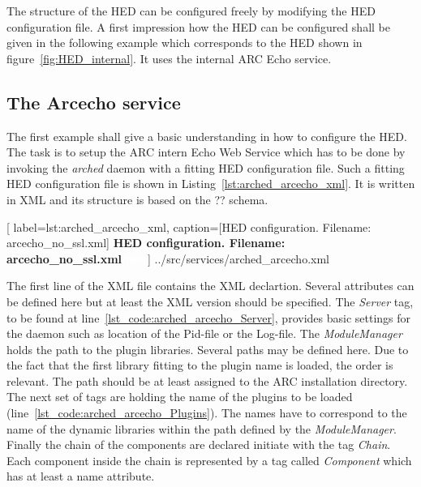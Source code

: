 The structure of the HED can be configured freely by modifying the HED configuration file. A first impression how the HED can be configured shall be given in the following example which corresponds to the HED shown in figure~\ref{fig:HED_internal}. It uses the internal ARC Echo service.



\subsection{The Arcecho service}
The first example shall give a basic understanding in how to configure the HED. The task is to setup the ARC intern Echo Web Service which has to be done by invoking the \textit{arched} daemon with a fitting HED configuration file. Such a fitting HED configuration file is shown in Listing~\ref{lst:arched_arcecho_xml}. It is written in XML and its structure is based on the \textcolor{urgent}{??} schema.
\\
\begin{program}
\centering

	[
	label=lst:arched_arcecho_xml,
	caption={[HED configuration. Filename: arcecho\_no\_ssl.xml]
	\textbf{HED configuration. Filename: arcecho\_no\_ssl.xml\textcolor{white}{hmf}}}
	]
{../src/services/arched_arcecho.xml}
\end{program}
The first line of the XML file contains the XML declartion. Several attributes can be defined here but at least the XML version should be specified.  %
The \textit{Server} tag, to be found at line~\ref{lst_code:arched_arcecho_Server}, provides basic settings for the daemon such as location of the Pid-file or the Log-file.
The \textit{ModuleManager} holds the path to the plugin libraries. Several paths may be defined here. Due to the fact that the first library fitting to the plugin name is loaded, the order is relevant. The path should be at least assigned to the ARC installation directory. %
The next set of tags are holding the name of the plugins to be loaded (line~\ref{lst_code:arched_arcecho_Plugins}).
The names have to correspond to the name of the dynamic libraries within the path defined by the \textit{ModuleManager}.
Finally the chain of the components are declared initiate with the tag \textit{Chain}.
Each component inside the chain is represented by a tag called \textit{Component} which has at least a name attribute.
